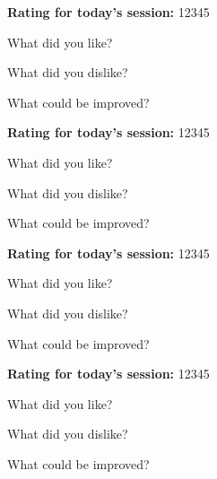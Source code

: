 \documentclass[10pt]{article}
\begin{document}
\textbf{Rating for today's session:}\hspace{0.25in}
1\hspace{0.25in}2\hspace{0.25in}3\hspace{0.25in}4\hspace{0.25in}5
\vspace{0.25in}

What did you like?
\vspace{0.25in}

What did you dislike?
\vspace{0.25in}

What could be improved?
\vspace{1.0in}

\textbf{Rating for today's session:}\hspace{0.25in}
1\hspace{0.25in}2\hspace{0.25in}3\hspace{0.25in}4\hspace{0.25in}5
\vspace{0.25in}

What did you like?
\vspace{0.25in}

What did you dislike?
\vspace{0.25in}

What could be improved?
\vspace{1.0in}

\textbf{Rating for today's session:}\hspace{0.25in}
1\hspace{0.25in}2\hspace{0.25in}3\hspace{0.25in}4\hspace{0.25in}5
\vspace{0.25in}

What did you like?
\vspace{0.25in}

What did you dislike?
\vspace{0.25in}

What could be improved?
\vspace{1.0in}

\textbf{Rating for today's session:}\hspace{0.25in}
1\hspace{0.25in}2\hspace{0.25in}3\hspace{0.25in}4\hspace{0.25in}5
\vspace{0.25in}

What did you like?
\vspace{0.25in}

What did you dislike?
\vspace{0.25in}

What could be improved?
\vspace{1.0in}
\end{document}
